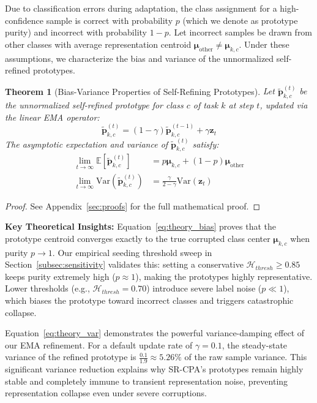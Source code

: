\documentclass{article}
\theoremstyle{plain}
\newtheorem{theorem}{Theorem}[section]
\theoremstyle{definition}
\theoremstyle{remark}
\begin{document}
Due to classification errors during adaptation, the class assignment for a high-confidence sample is correct with probability $p$ (which we denote as prototype purity) and incorrect with probability $1-p$. Let incorrect samples be drawn from other classes with average representation centroid $\boldsymbol{\mu}_{\text{other}} \neq \boldsymbol{\mu}_{k,c}$. Under these assumptions, we characterize the bias and variance of the unnormalized self-refined prototypes.

\begin{theorem}[Bias-Variance Properties of Self-Refining Prototypes]
Let $\tilde{\boldsymbol{p}}_{k,c}^{(t)}$ be the unnormalized self-refined prototype for class $c$ of task $k$ at step $t$, updated via the linear EMA operator:
\begin{equation}
    \tilde{\boldsymbol{p}}_{k,c}^{(t)} = (1 - \gamma) \tilde{\boldsymbol{p}}_{k,c}^{(t-1)} + \gamma \boldsymbol{z}_t
\end{equation}
The asymptotic expectation and variance of $\tilde{\boldsymbol{p}}_{k,c}^{(t)}$ satisfy:
\begin{align}
    \lim_{t \to \infty} \mathbb{E}[\tilde{\boldsymbol{p}}_{k,c}^{(t)}] &= p \boldsymbol{\mu}_{k,c} + (1-p)\boldsymbol{\mu}_{\text{other}} \label{eq:theory_bias} \\
    \lim_{t \to \infty} \text{Var}(\tilde{\boldsymbol{p}}_{k,c}^{(t)}) &= \frac{\gamma}{2 - \gamma} \text{Var}(\boldsymbol{z}_t) \label{eq:theory_var}
\end{align}
\end{theorem}

\begin{proof}
See Appendix~\ref{sec:proofs} for the full mathematical proof.
\end{proof}

\textbf{Key Theoretical Insights:}
Equation~\eqref{eq:theory_bias} proves that the prototype centroid converges exactly to the true corrupted class center $\boldsymbol{\mu}_{k,c}$ when purity $p \to 1$. Our empirical seeding threshold sweep in Section~\ref{subsec:sensitivity} validates this: setting a conservative $\mathcal{H}_{thresh} \ge 0.85$ keeps purity extremely high ($p \approx 1$), making the prototypes highly representative. Lower thresholds (e.g., $\mathcal{H}_{thresh}=0.70$) introduce severe label noise ($p \ll 1$), which biases the prototype toward incorrect classes and triggers catastrophic collapse.

Equation~\eqref{eq:theory_var} demonstrates the powerful variance-damping effect of our EMA refinement. For a default update rate of $\gamma = 0.1$, the steady-state variance of the refined prototype is $\frac{0.1}{1.9} \approx 5.26\%$ of the raw sample variance. This significant variance reduction explains why SR-CPA's prototypes remain highly stable and completely immune to transient representation noise, preventing representation collapse even under severe corruptions.
\end{document}
